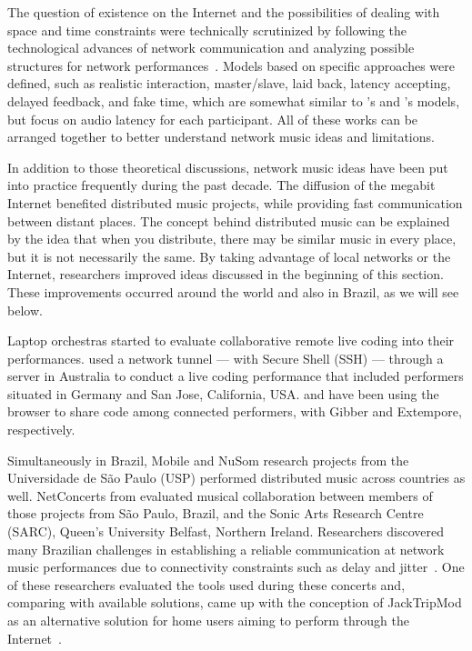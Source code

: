 The question of existence on the Internet and the possibilities of dealing with space and time constraints were technically scrutinized by following the technological advances of network communication and analyzing possible structures for network performances~\citep{Carot2007network,Carot2007networked,Carot2008distributed,Carot2009fundamentals,Carot2010low}.
Models based on specific approaches were defined, such as realistic interaction, master/slave, laid back, latency accepting, delayed feedback, and fake time, which are somewhat similar to 's and 's models, but focus on audio latency for each participant.
All of these works can be arranged together to better understand network music ideas and limitations. 

In addition to those theoretical discussions, network music ideas have been put into practice frequently during the past decade.
The diffusion of the megabit Internet benefited distributed music projects, while providing fast communication between distant places.
The concept behind distributed music can be explained by the idea that when you distribute, there may be similar music in every place, but it is not necessarily the same.
By taking advantage of local networks or the Internet, researchers improved ideas discussed in the beginning of this section.
These improvements occurred around the world and also in Brazil, as we will see below.

Laptop orchestras started to evaluate collaborative remote live coding into their performances.
\cite{Swift2014networked} used a network tunnel --- with Secure Shell (SSH) --- through a server in Australia to conduct a live coding performance that included performers situated in Germany and San Jose, California, USA.
\cite{Roberts2012gibberlivecoding} and \cite{Ogborn2014live} have been using the browser to share code among connected performers, with Gibber and Extempore, respectively.

Simultaneously in Brazil, Mobile and NuSom research projects from the Universidade de São Paulo (USP) performed distributed music across countries as well.
NetConcerts from \citep{Arango2014thesis} evaluated musical collaboration between members of those projects from São Paulo, Brazil, and the Sonic Arts Research Centre (SARC), Queen's University Belfast, Northern Ireland.
Researchers discovered many Brazilian challenges in establishing a reliable communication at network music performances due to connectivity constraints such as delay and jitter~\citep{Arango2013challenges,Arango2014thesis}.
One of these researchers evaluated the tools used during these concerts and, comparing with available solutions, came up with the conception of JackTripMod as an alternative solution for home users aiming to perform through the Internet~\citep{Tomiyoshi2013thesis}.

